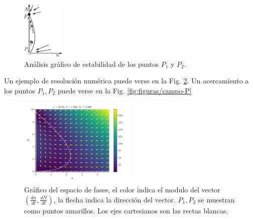 \documentclass[twocolumn,aps,prl]{revtex4-1}
\begin{document}

\begin{figure}[!ht]
    \centering  
    \includegraphics[width=0.18\textwidth]{figuras/cosa.pdf}
    \caption{Análisis gráfico de estabilidad de los puntos $P_1$ y $P_2$.}
    \label{fig:cosa}
\end{figure}

Un ejemplo de resolución numérica puede verse en la Fig. \ref{fig:figuras/campo}. Un acercamiento a los puntos $P_1, P_2$ puede verse en la Fig. \ref{fig:figuras/campo-P}

\begin{figure}[ht!]
    \centering
        \includegraphics[width = 0.5\textwidth]{figuras/campo.pdf}
        \caption{Gráfico del espacio de fases, el color indica el modulo del vector $(\frac{dn}{dt}, \frac{dN}{dt})$, la flecha indica la dirección del vector. $P_1, P_2$ se muestran como puntos amarillos. Los ejes cartesianos son las rectas blancas.}
        \label{fig:figuras/campo}
\end{figure}
\end{document}
